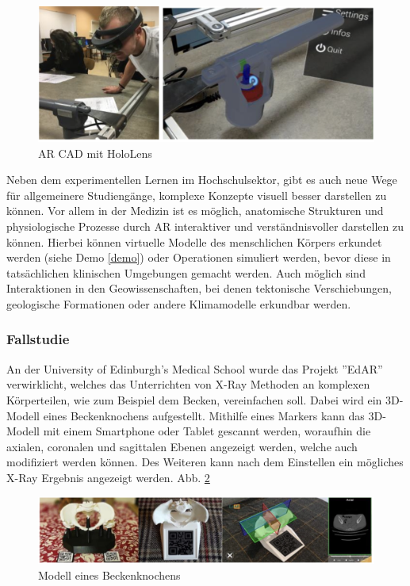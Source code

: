 \documentclass[conference]{IEEEtran}
\begin{document}
\begin{figure}[htbp]
    \centerline{\includegraphics[scale=0.25]{img/ingen.png}}
    \caption{AR CAD mit HoloLens \cite{b9}}
    \label{fig5}
\end{figure}

Neben dem experimentellen Lernen im Hochschulsektor, gibt es auch neue Wege für allgemeinere Studiengänge, komplexe Konzepte visuell besser darstellen zu können.
Vor allem in der Medizin ist es möglich, anatomische Strukturen und physiologische Prozesse durch AR interaktiver und verständnisvoller darstellen zu können.
Hierbei können virtuelle Modelle des menschlichen Körpers erkundet werden (siehe Demo \ref{demo}) oder Operationen simuliert werden, bevor diese in tatsächlichen klinischen Umgebungen gemacht werden. 
\cite{b10} Auch möglich sind Interaktionen in den Geowissenschaften, bei denen tektonische Verschiebungen, geologische Formationen oder andere Klimamodelle erkundbar werden.

\subsubsection{Fallstudie}
An der University of Edinburgh's Medical School wurde das Projekt ''EdAR'' verwirklicht, welches das Unterrichten von X-Ray Methoden an komplexen Körperteilen,
wie zum Beispiel dem Becken, vereinfachen soll. \cite{b11} Dabei wird ein 3D-Modell eines Beckenknochens aufgestellt. Mithilfe eines Markers kann das 3D-Modell mit einem Smartphone oder Tablet gescannt werden, woraufhin die axialen, coronalen und sagittalen Ebenen angezeigt werden, welche auch modifiziert werden können. Des Weiteren
kann nach dem Einstellen ein mögliches X-Ray Ergebnis angezeigt werden. Abb. \ref{fig6}

\begin{figure}[htbp]
    \centerline{\includegraphics[scale=0.45]{img/bone.png}}
    \caption{Modell eines Beckenknochens \cite{b11}}
    \label{fig6}
\end{figure}
\end{document}
